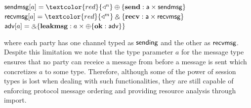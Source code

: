 %
%
\begin{center}
\parbox{0cm}{
\begin{tabbing}
$\m{sendmsg}[a] = \textcolor{red}{\getpot^n} \ichoice{\mb{send}: \m{a} \product \m{sendmsg}}$ \\
$\m{recvmsg}[a] = \textcolor{red}{\getpot^m} \echoice{\mb{recv}: \m{a} \product \m{recvmsg}}$ \\
$\mathsf{adv}[a] = \mathbin{\binampersand} \{ \mathbf{leakmsg}: a \times \oplus \{  \mathbf{ok}: \mathsf{adv} \} \}$
\end{tabbing}}
\end{center}
where each party has one channel typed as $\mathsf{sending}$ and the other as $\mathsf{recvmsg}$.
Despite this limitation we note that the type parameter $a$ for the message type ensures that no party can receice a message from \Fauth before a message is sent which concretizes $a$ to some type.
Therefore, although some of the power of session types is lost when dealing with such functionalities, they are still capable of enforcing protocol message ordering and providing resource analysis through import.

